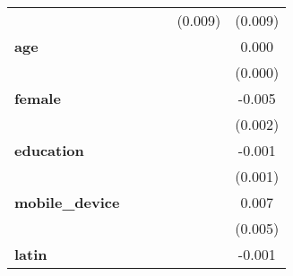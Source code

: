 \begin{center}
\begin{tabular}{lccccc}
\textbf{ }                                            &                  &                  &                  &     (0.009)      &     (0.009)       \\
\textbf{age}                                          &                  &                  &                  &                  &      0.000        \\
\textbf{ }                                            &                  &                  &                  &                  &     (0.000)       \\
\textbf{female}                                       &                  &                  &                  &                  &      -0.005       \\
\textbf{ }                                            &                  &                  &                  &                  &     (0.002)       \\
\textbf{education}                                    &                  &                  &                  &                  &      -0.001       \\
\textbf{ }                                            &                  &                  &                  &                  &     (0.001)       \\
\textbf{mobile\_device}                               &                  &                  &                  &                  &      0.007        \\
\textbf{ }                                            &                  &                  &                  &                  &     (0.005)       \\
\textbf{latin}                                        &                  &                  &                  &                  &      -0.001       \\
\bottomrule
\end{tabular}
\end{center}